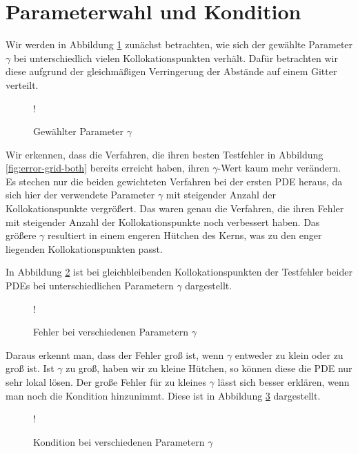 \section{Parameterwahl und Kondition}
Wir werden in Abbildung \ref{fig:gamma-grid} zunächst betrachten, wie sich der gewählte Parameter $\gamma$ bei unterschiedlich vielen Kollokationspunkten verhält. Dafür betrachten wir diese aufgrund der gleichmäßigen Verringerung der Abstände auf einem Gitter verteilt. 

\begin{figure}[ht]
\centering
\resizebox {\columnwidth} {!} {

}
\caption{Gewählter Parameter $\gamma$}
\label{fig:gamma-grid}
\end{figure}
Wir erkennen, dass die Verfahren, die ihren besten Testfehler in Abbildung \ref{fig:error-grid-both} bereits erreicht haben, ihren $\gamma$-Wert kaum mehr verändern. Es stechen nur die beiden gewichteten Verfahren bei der ersten \ac{PDE} heraus, da sich hier der verwendete Parameter $\gamma$ mit steigender Anzahl der Kollokationspunkte vergrößert. Das waren genau die Verfahren, die ihren Fehler mit steigender Anzahl der Kollokationspunkte noch verbessert haben. Das größere $\gamma$ resultiert in einem engeren \glqq Hütchen\grqq{} des Kerns, was zu den enger liegenden Kollokationspunkten passt.

In Abbildung \ref{fig:gamma-fehler} ist bei gleichbleibenden Kollokationspunkten der Testfehler beider \acp{PDE} bei unterschiedlichen Parametern $\gamma$ dargestellt.

\begin{figure}[ht]
\centering
\resizebox {\columnwidth} {!} {

}
\caption{Fehler bei verschiedenen Parametern $\gamma$}
\label{fig:gamma-fehler}
\end{figure}

Daraus erkennt man, dass der Fehler groß ist, wenn $\gamma$ entweder zu klein oder zu groß ist. Ist $\gamma$ zu groß, haben wir zu kleine \glqq Hütchen\grqq , so können diese die \ac{PDE} nur sehr lokal lösen. Der große Fehler für zu kleines $\gamma$ lässt sich besser erklären, wenn man noch die Kondition hinzunimmt. Diese ist in Abbildung \ref{fig:kondition} dargestellt.

\begin{figure}[H]
\centering
\resizebox {\columnwidth} {!} {

}
\caption{Kondition bei verschiedenen Parametern $\gamma$}
\label{fig:kondition}
\end{figure}

